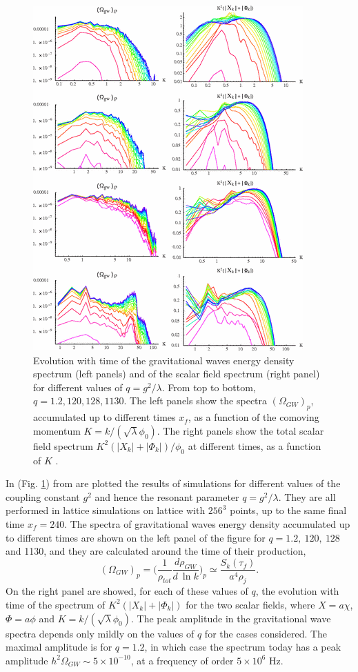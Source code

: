 \documentclass[11pt,a4paper,twoside]{book}
\begin{document}
\begin{figure}
	\centering
	\includegraphics[width=0.65\linewidth, height=0.55\textheight]{Images/Chap7/GreenMethod_Fig8}
	\caption{Evolution with time of the gravitational waves energy density spectrum (left panels) and of the scalar field spectrum (right panel) for different values of $ q=g^{2}/\lambda $. From top to bottom, $ q=1.2,120,128,1130 $. The left panels show  the spectra $ (\Omega_{GW})_{p} $, accumulated up to different times $ x_{f} $, as a function of the comoving momentum $ K=k/(\sqrt{\lambda}\phi_{0}) $. The right panels show the total scalar field spectrum $ K^{2}(|X_{k}| + |\Phi_{k}|)/\phi_{0} $ at different times, as a function of $ K $ \cite{Chap7:GreenMethod}.}
	\label{fig:greenmethodfig8}
\end{figure}

In (Fig. \ref{fig:greenmethodfig8}) from \cite{Chap7:GreenMethod} are plotted the results of simulations for different values of the coupling constant $ g^{2} $ and hence the resonant parameter $ q=g^{2}/\lambda $. They are all performed in lattice simulations on lattice with $ 256^{3} $ points, up to the same final time $ x_{f}=240 $. The spectra of gravitational waves energy density accumulated up to different times are shown on the left panel of the figure for $ q=1.2,\ 120,\ 128 $ and 1130, and they are calculated around the time of their production,
\begin{equation}
(\Omega_{GW})_{p}=\Bigg(\frac{1}{\rho_{tot}}\frac{d\rho_{GW}}{d\ \ln k}\Bigg)_{p} \simeq \frac{S_{k}(\tau_{f})}{a^{4}\rho_{j}}.
\end{equation}
 On the right panel are showed, for each of these values of $ q $, the evolution with time of the spectrum of $ K^{2}(|X_{k}| + |\Phi_{k}|) $ for the two scalar fields, where $ X=a\chi $, $ \Phi=a\phi $ and $ K=k/(\sqrt{\lambda} \phi_{0}) $. The peak amplitude in the gravitational wave spectra depends only mildly on the values of $ q $ for the cases considered. The maximal amplitude is for $ q=1.2 $, in which case the spectrum today has a peak amplitude $ h^{2}\Omega_{GW}\sim 5 \times 10^{-10} $, at a frequency of order $ 5 \times 10^{6} $ Hz. 
 
\end{document}
